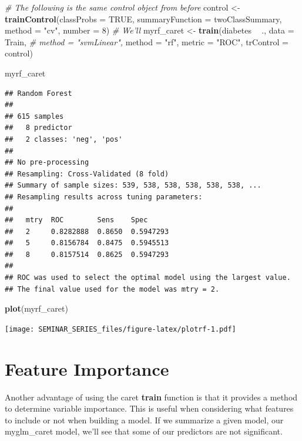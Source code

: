 \documentclass[]{book}
\newenvironment{Shaded}{\begin{snugshade}}{\end{snugshade}}
\newcommand{\KeywordTok}[1]{\textcolor[rgb]{0.13,0.29,0.53}{\textbf{#1}}}
\newcommand{\DataTypeTok}[1]{\textcolor[rgb]{0.13,0.29,0.53}{#1}}
\newcommand{\DecValTok}[1]{\textcolor[rgb]{0.00,0.00,0.81}{#1}}
\newcommand{\StringTok}[1]{\textcolor[rgb]{0.31,0.60,0.02}{#1}}
\newcommand{\CommentTok}[1]{\textcolor[rgb]{0.56,0.35,0.01}{\textit{#1}}}
\newcommand{\OtherTok}[1]{\textcolor[rgb]{0.56,0.35,0.01}{#1}}
\newcommand{\OperatorTok}[1]{\textcolor[rgb]{0.81,0.36,0.00}{\textbf{#1}}}
\newcommand{\NormalTok}[1]{#1}
\begin{document}
\begin{Shaded}
\begin{Highlighting}[]
\CommentTok{# The following is the same control object from before}
\NormalTok{control <-}\StringTok{ }\KeywordTok{trainControl}\NormalTok{(}\DataTypeTok{classProbs =} \OtherTok{TRUE}\NormalTok{,}
                        \DataTypeTok{summaryFunction =}\NormalTok{ twoClassSummary,}
                        \DataTypeTok{method =} \StringTok{"cv"}\NormalTok{,}
                        \DataTypeTok{number =} \DecValTok{8}\NormalTok{)}
\CommentTok{# We'll }
\NormalTok{myrf_caret <-}\StringTok{ }\KeywordTok{train}\NormalTok{(diabetes }\OperatorTok{~}\StringTok{ }\NormalTok{.,}
               \DataTypeTok{data =}\NormalTok{ Train,}
 \CommentTok{#              method = "svmLinear",}
               \DataTypeTok{method =} \StringTok{"rf"}\NormalTok{,}
               \DataTypeTok{metric =} \StringTok{"ROC"}\NormalTok{,}
               \DataTypeTok{trControl =}\NormalTok{ control)}

\NormalTok{myrf_caret}
\end{Highlighting}
\end{Shaded}

\begin{verbatim}
## Random Forest 
## 
## 615 samples
##   8 predictor
##   2 classes: 'neg', 'pos' 
## 
## No pre-processing
## Resampling: Cross-Validated (8 fold) 
## Summary of sample sizes: 539, 538, 538, 538, 538, 538, ... 
## Resampling results across tuning parameters:
## 
##   mtry  ROC        Sens    Spec     
##   2     0.8282888  0.8650  0.5947293
##   5     0.8156784  0.8475  0.5945513
##   8     0.8157514  0.8625  0.5947293
## 
## ROC was used to select the optimal model using the largest value.
## The final value used for the model was mtry = 2.
\end{verbatim}

\begin{Shaded}
\begin{Highlighting}[]
\KeywordTok{plot}\NormalTok{(myrf_caret)}
\end{Highlighting}
\end{Shaded}

\texttt{[image: SEMINAR\_SERIES\_files/figure-latex/plotrf-1.pdf]}

\chapter{Feature Importance}\label{feature-importance}

Another advantage of using the caret \textbf{train} function is that it
provides a method to determine variable importance. This is useful when
considering what features to include or not when building a model. If we
summarize a given model, our myglm\_caret model, we'll see that some of
our predictors are not significant.
\end{document}
